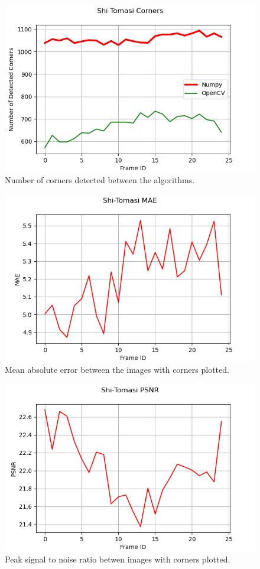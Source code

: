 \documentclass[11pt, conference, letterpaper]{IEEEtran}
\begin{document}
\begin{figure}[t]
    \centering
    \includegraphics[width=0.9\linewidth]{images/stc_corners.png}
    \caption{Number of corners detected between the algorithms.}
    \label{fig:stc-corners}
\end{figure}

\begin{figure}[t]
    \centering
    \includegraphics[width=0.9\linewidth]{images/stc_mae.png}
    \caption{Mean absolute error between the images with corners plotted.}
    \label{fig:stc-mae}
\end{figure}

\begin{figure}[t]
    \centering
    \includegraphics[width=0.9\linewidth]{images/stc_psnr.png}
    \caption{Peak signal to noise ratio betwen images with corners plotted.}
    \label{fig:stc-psnr}
\end{figure}
\end{document}
